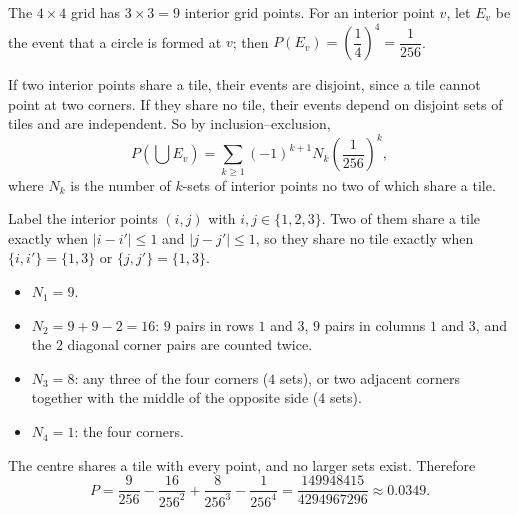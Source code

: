 The $4\times4$ grid has $3\times3=9$ interior grid points. For an interior point $v$, let $E_v$ be the event that a circle is formed at $v$; then $P(E_v)=\left(\dfrac14\right)^4=\dfrac{1}{256}$.

If two interior points share a tile, their events are disjoint, since a tile cannot point at two corners. If they share no tile, their events depend on disjoint sets of tiles and are independent. So by inclusion--exclusion,
\[P\left(\bigcup E_v\right)=\sum_{k\ge1}(-1)^{k+1}N_k\left(\dfrac{1}{256}\right)^k,\]
where $N_k$ is the number of $k$-sets of interior points no two of which share a tile.

Label the interior points $(i,j)$ with $i,j\in\{1,2,3\}$. Two of them share a tile exactly when $|i-i'|\le1$ and $|j-j'|\le1$, so they share no tile exactly when $\{i,i'\}=\{1,3\}$ or $\{j,j'\}=\{1,3\}$.
\begin{itemize}
\item $N_1=9$.
\item $N_2=9+9-2=16$: $9$ pairs in rows $1$ and $3$, $9$ pairs in columns $1$ and $3$, and the $2$ diagonal corner pairs are counted twice.
\item $N_3=8$: any three of the four corners ($4$ sets), or two adjacent corners together with the middle of the opposite side ($4$ sets).
\item $N_4=1$: the four corners.
\end{itemize}
The centre shares a tile with every point, and no larger sets exist. Therefore
\[P=\dfrac{9}{256}-\dfrac{16}{256^2}+\dfrac{8}{256^3}-\dfrac{1}{256^4}=\boxed{\dfrac{149948415}{4294967296}}\approx0.0349.\]
